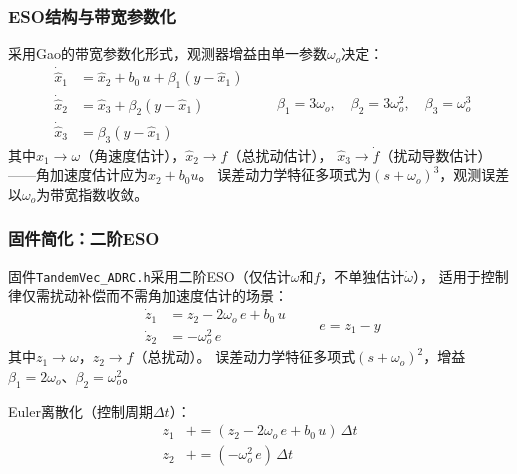 \subsubsection{ESO结构与带宽参数化}

采用Gao的带宽参数化形式\cite{gao2006bandwidth}，观测器增益由单一参数$\omega_o$决定：
\begin{equation}
    \boxed{
    \begin{aligned}
        \dot{\hat{x}}_1 &= \hat{x}_2 + b_0\,u + \beta_1(y - \hat{x}_1) \\
        \dot{\hat{x}}_2 &= \hat{x}_3 + \beta_2(y - \hat{x}_1) \\
        \dot{\hat{x}}_3 &= \beta_3(y - \hat{x}_1)
    \end{aligned}
    }
    \qquad
    \beta_1 = 3\omega_o,\quad
    \beta_2 = 3\omega_o^2,\quad
    \beta_3 = \omega_o^3
    \label{eq:eso_continuous}
\end{equation}
其中$\hat{x}_1\to\omega$（角速度估计），$\hat{x}_2\to f$（总扰动估计），
$\hat{x}_3\to\dot f$（扰动导数估计）——角加速度估计应为$\hat{x}_2 + b_0 u$。
误差动力学特征多项式为$(s+\omega_o)^3$，观测误差以$\omega_o$为带宽指数收敛。

\subsubsection{固件简化：二阶ESO}

固件\texttt{TandemVec\_ADRC.h}采用二阶ESO（仅估计$\omega$和$f$，不单独估计$\dot\omega$），
适用于控制律仅需扰动补偿而不需角加速度估计的场景：
\begin{equation}
    \boxed{
    \begin{aligned}
        \dot{z}_1 &= z_2 - 2\omega_o\,e + b_0\,u \\
        \dot{z}_2 &= -\omega_o^2\,e
    \end{aligned}
    }
    \qquad e = z_1 - y
    \label{eq:eso2_continuous}
\end{equation}
其中$z_1\to\omega$，$z_2\to f$（总扰动）。
误差动力学特征多项式$(s+\omega_o)^2$，增益$\beta_1=2\omega_o$、$\beta_2=\omega_o^2$。

Euler离散化（控制周期$\Delta t$）：
\begin{equation}
    \begin{aligned}
        z_1 &\mathrel{+}= (z_2 - 2\omega_o\,e + b_0\,u)\,\Delta t \\
        z_2 &\mathrel{+}= (-\omega_o^2\,e)\,\Delta t
    \end{aligned}
    \label{eq:eso2_discrete}
\end{equation}

